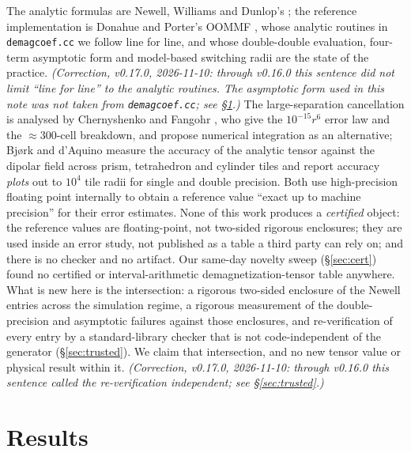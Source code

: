 \documentclass[11pt]{amsart}
\theoremstyle{plain}
\theoremstyle{definition}
\theoremstyle{remark}
\begin{document}
The analytic formulas are Newell, Williams and Dunlop's \cite{Newell1993}; the
reference implementation is Donahue and Porter's OOMMF \cite{OOMMF}, whose
analytic routines in \texttt{demagcoef.cc} we follow line for line, and whose
double-double evaluation, four-term asymptotic form and model-based switching
radii are the state of the practice. \emph{(Correction, v0.17.0, 2026-11-10:
through v0.16.0 this sentence did not limit ``line for line'' to the analytic
routines. The asymptotic form used in this note was not taken from
\texttt{demagcoef.cc}; see \S\ref{sec:results}.)} The large-separation
cancellation is analysed by Chernyshenko and Fangohr \cite{CF2015}, who give the
$10^{-15}r^{6}$ error law and the $\approx 300$-cell breakdown, and propose
numerical integration as an alternative; Bj\o rk and d'Aquino \cite{Bjork2023}
measure the accuracy of the analytic tensor against the dipolar field across
prism, tetrahedron and cylinder tiles and report accuracy \emph{plots} out to
$10^{4}$ tile radii for single and double precision. Both use high-precision
floating point internally to obtain a reference value ``exact up to machine
precision'' for their error estimates. None of this work produces a
\emph{certified} object: the reference values are floating-point, not two-sided
rigorous enclosures; they are used inside an error study, not published as a
table a third party can rely on; and there is no checker and no artifact. Our
same-day novelty sweep (\S\ref{sec:cert}) found no certified or interval-arithmetic
demagnetization-tensor table anywhere. What is new here is the intersection: a
rigorous two-sided enclosure of the Newell entries across the simulation regime,
a rigorous measurement of the double-precision and asymptotic failures against
those enclosures, and re-verification of every entry by a standard-library
checker that is not code-independent of the generator (\S\ref{sec:trusted}). We
claim that intersection, and no new tensor value or physical result within it.
\emph{(Correction, v0.17.0, 2026-11-10: through v0.16.0 this sentence called the
re-verification independent; see \S\ref{sec:trusted}.)}

\section{Results}\label{sec:results}
\end{document}
